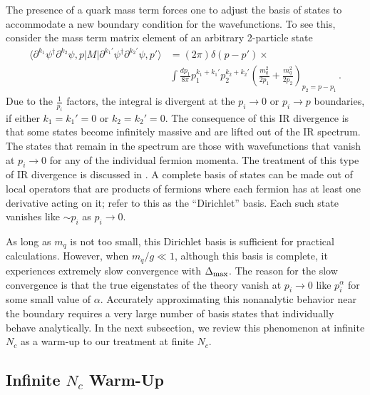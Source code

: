 \documentclass[12pt]{article}
\def\>{\rangle}
\def\<{\langle}
\renewcommand{\d}{\partial}
\newcommand{\pr}[1]{\left(#1 \right)}
\begin{document}
The presence of a quark mass term forces one to adjust the basis of states to accommodate a new boundary condition for the wavefunctions.  To see this, consider the mass term matrix element of
an arbitrary 2-particle state
\begin{equation}
\begin{aligned}
\label{eq:IRDiv}
\< \d^{k_1}\psi^\dagger \d^{k_2}\psi, p | M | \d^{k_1'}\psi^\dagger \d^{k_2'}\psi, p' \> &= 
(2\pi)\delta(p-p') \times \\
&
\int \frac{dp_1}{8\pi} 
	p_1^{k_1+k_1'} p_2^{k_2+k_2'} 
 \pr{\frac{m_q^2}{2p_1}+\frac{m_q^2}{2p_2}}_{p_2=p-p_1} \, .
\end{aligned}
\end{equation}
Due to the $\frac{1}{p_i}$ factors, the integral is divergent at the $p_i\rightarrow 0$ or $p_i \rightarrow p$
boundaries, if either $k_1=k_1'=0$ or $k_2=k_2'=0$. The consequence of this IR
divergence is that some states become infinitely massive and are lifted 
out of the IR spectrum. The states that remain in the spectrum are those with wavefunctions that vanish at $p_i \rightarrow 0$ for any of the individual fermion momenta. The treatment of this type of IR divergence is discussed in \cite{Anand:2020gnn}. A complete basis of states can be made out of local operators that are products of fermions where each fermion has at least one derivative acting on it; \cite{Anand:2020gnn} refer to this as the ``Dirichlet'' basis.  Each such state vanishes like $\sim p_i$ as $p_i \rightarrow 0$.  

As long as $m_q$ is not too small, this Dirichlet basis is sufficient for practical calculations.  However, when $m_q/g \ll 1$, although this basis is complete, it experiences extremely slow convergence with $\Delta_{\rm max}$.  The reason for the slow convergence is that the true eigenstates of the theory vanish at $p_i\rightarrow 0$ like $p_i^\alpha$ for some small value of $\alpha$.  Accurately approximating this nonanalytic behavior near the boundary requires a very large number of basis states that individually behave analytically. In the next subsection, we review this phenomenon at infinite $N_c$ as a warm-up to our treatment at finite $N_c$. 



\subsection{Infinite $N_c$ Warm-Up}
\end{document}
